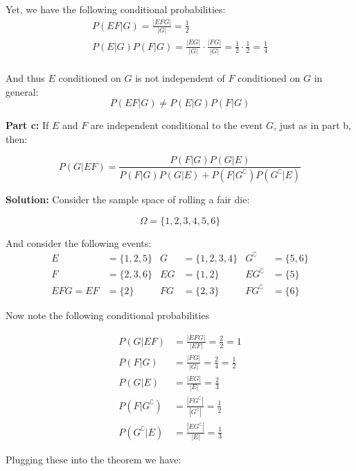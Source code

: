 \documentclass{article}
\begin{document}
Yet, we have the following conditional probabilities:
\begin{gather*}
    P(EF|G)=\frac{|EFG|}{|G|}=\frac{1}{2}\\
    P(E|G)P(F|G)=\frac{|EG|}{|G|}\cdot\frac{|FG|}{|G|}=\frac{1}{2}\cdot\frac{1}{2}=\frac{1}{4}\\
\end{gather*}

And thus $E$ conditioned on $G$ is not independent of $F$ conditioned on $G$ in general:
\begin{equation*}
    P(EF|G)\not=P(E|G)P(F|G)
\end{equation*}

\noindent\textbf{Part c:} If $E$ and $F$ are independent conditional to the event $G$, just as in part b, then:

\begin{equation*}
    P(G|EF)=\frac{P(F|G)P(G|E)}{P(F|G)P(G|E)+P(F|G^\complement)P(G^\complement|E)}
\end{equation*}
\medskip

\noindent\textbf{Solution:} Consider the sample space of rolling a fair die:

\begin{equation*}
    \Omega=\{1,2,3,4,5,6\}
\end{equation*}

And consider the following events:
\begin{align*}
    E&=\{1,2,5\} & G&=\{1,2,3,4\} & G^\complement&=\{5,6\}\\
    F&=\{2,3,6\} & EG&=\{1,2\} & EG^\complement&=\{5\}\\
    EFG=EF&=\{2\} & FG&=\{2,3\} & FG^\complement&=\{6\}
\end{align*}

Now note the following conditional probabilities

\begin{align*}
    P(G|EF)&=\frac{|EFG|}{|EF|}=\frac{2}{2}=1\\
    P(F|G)&=\frac{|FG|}{|G|}=\frac{2}{4}=\frac{1}{2}\\
    P(G|E)&=\frac{|EG|}{|E|}=\frac{2}{3}\\
    P(F|G^\complement)&=\frac{|FG^\complement|}{|G^\complement|}=\frac{1}{2}\\
    P(G^\complement|E)&=\frac{|EG^\complement|}{|E|}=\frac{1}{3}
\end{align*}

Plugging these into the theorem we have:
\end{document}
